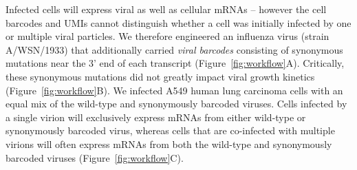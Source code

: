 \documentclass[9pt,lineno]{elife}
\begin{document}
Infected cells will express viral as well as cellular mRNAs -- however the cell barcodes and UMIs cannot distinguish whether a cell was initially infected by one or multiple viral particles.
We therefore engineered an influenza virus (strain A/WSN/1933) that additionally carried \emph{viral barcodes} consisting of synonymous mutations near the 3' end of each transcript (Figure~\ref{fig:workflow}A).
Critically, these synonymous mutations did not greatly impact viral growth kinetics (Figure~\ref{fig:workflow}B).
We infected A549 human lung carcinoma cells with an equal mix of the wild-type and synonymously barcoded viruses.
Cells infected by a single virion will exclusively express mRNAs from either wild-type or synonymously barcoded virus, whereas cells that are co-infected with multiple virions will often express mRNAs from both the wild-type and synonymously barcoded viruses (Figure~\ref{fig:workflow}C).
\end{document}
